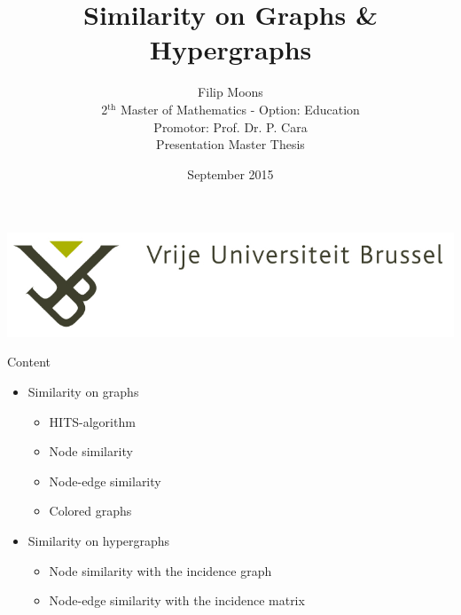 \documentclass{beamer}
\title{Similarity on Graphs \& Hypergraphs}
\author{Filip Moons\\2$^{\text{th}}$ Master of Mathematics - Option: Education\\Promotor: Prof. Dr. P. Cara\\Presentation Master Thesis}
\date{September 2015}
\begin{document}
\begin{frame}[plain]
\includegraphics[width=0.4\paperwidth]{VUB_logo.jpg}
\vspace{2cm}
\titlepage
\end{frame}



%
%
%
%

\begin{frame}{Content}
\begin{itemize}
  \item Similarity on graphs
    \begin{itemize}
        \item HITS-algorithm
        \item Node similarity
        \item Node-edge similarity
        \item Colored graphs
    \end{itemize}
  \item Similarity on hypergraphs
    \begin{itemize}
        \item Node similarity with the incidence graph
        \item Node-edge similarity with the incidence matrix
    \end{itemize}

\end{itemize}

\end{frame}
\end{document}
